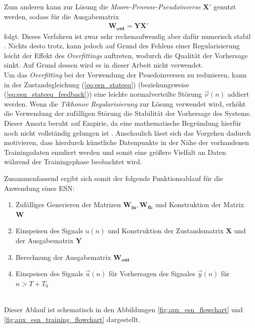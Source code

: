Zum anderen kann zur Lösung die \textit{Moore-Penrose-Pseudoinverse} $\mathbf{X}'$ genutzt werden, sodass für die Ausgabematrix
\begin{align}
\label{eq:pseudo_inverse}
\mathbf{W_{out}} = \mathbf{Y} \mathbf{X}'
\end{align}
folgt. Dieses Verfahren ist zwar sehr rechenaufwendig aber dafür numerisch stabil \cite{lukoseviciusa2009, jaeger2012}. Nichts desto trotz, kann jedoch auf Grund des Fehlens einer Regularisierung leicht der Effekt des \textit{Overfittings} auftreten, wodurch die Qualität der Vorhersage sinkt. Auf Grund dessen wird es in dieser Arbeit nicht verwendet.\\

Um das \textit{Overfitting} bei der Verwendung der Psuedoinversen zu reduzieren, kann in der Zustandsgleichung (\ref{eq:esn_stateeq}) (beziehungsweise (\ref{eq:esn_stateeq_feedback})) eine leichte normalverteilte Störung $\vec{\nu}(n)$ addiert werden. Wenn die \textit{Tikhonov Regularisierung} zur Lösung verwendet wird, erhöht die Verwendung der zufälligen Störung die Stabilität der Vorhersage des Systems. Dieser Ansatz beruht auf Empirie, da eine mathematische Begründung hierfür noch nicht vollständig gelungen ist \citep{jaeger2010, lukoseviciusa2009}. Anschaulich lässt sich das Vorgehen dadurch motivieren, dass hierdurch künstliche Datenpunkte in der Nähe der vorhandenen Trainingsdaten emuliert werden und somit eine größere Vielfalt an Daten während der Trainingsphase beobachtet wird.\\

\hspace{-0.5cm}
\begin{minipage}{\textwidth}
Zusammenfassend ergibt sich somit der folgende Funktionsablauf für die Anwendung eines \textsc{ESN}:

\singlespacing
\begin{enumerate}
	\item Zufälliges Generieren der Matrizen $\mathbf{W_{in}}, \mathbf{W_{fb}}$ und Konstruktion der Matrix $\mathbf{W}$ 
	\item Einspeisen des Signals $u(n)$ und Konstruktion der Zustandsmatrix $\mathbf{X}$ und der Ausgabematrix $\mathbf{Y}$ 
	\item Berechnung der Ausgabematrix $\mathbf{W_{out}}$
	\item Einspeisen des Signals $\vec{u}(n)$ für Vorhersagen des Signales $\vec{y}(n)$ für $n > T + T_0$
\end{enumerate}
\onehalfspacing
\end{minipage}\\

Dieser Ablauf ist schematisch in den Abbildungen \ref{fig:apx_esn_flowchart} und \ref{fig:apx_esn_training_flowchart} dargestellt.

